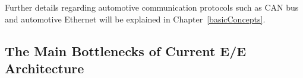     Further details regarding automotive communication protocols such as CAN bus and automotive Ethernet will be explained in Chapter~\ref{basicConcepts}. 
    
    \subsection{The Main Bottlenecks of Current E/E Architecture} \label{current}
    
